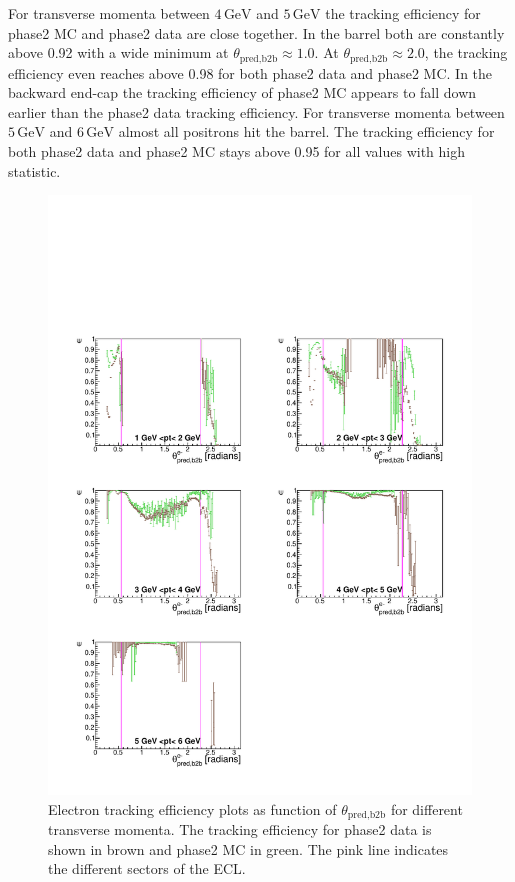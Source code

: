 \documentclass[a4paper,11pt,twosided,final,german,openbib,pdftex,listof=totoc,bibliography=totoc]{scrbook}
\begin{document}
For transverse momenta between $4\,\textrm{GeV}$  and $5\,\textrm{GeV}$ the tracking efficiency for phase2 MC and phase2 data are close together. In the barrel both are constantly above 0.92 with a wide minimum at $\theta_{\textrm{pred,b2b}} \approx 1.0$. At $\theta_{\textrm{pred,b2b}} \approx 2.0$, the tracking efficiency even reaches above 0.98 for both phase2 data and phase2 MC. In the backward end-cap the tracking efficiency of phase2 MC appears to fall down earlier than the phase2 data tracking efficiency.
For transverse momenta between $5\,\textrm{GeV}$ and $6\,\textrm{GeV}$ almost all positrons hit the barrel. The tracking efficiency for both phase2 data and phase2 MC stays above 0.95 for all values with high statistic.

\begin{figure}[!htbp]
	\centering
	\includegraphics[width=\textwidth]{Plots/master/xPtMThetaem}
	\caption[Transverse Momentum $\theta_{\textrm{pred,b2b}}$ Electron Efficiency Phase2]{Electron tracking efficiency plots as function of $\theta_{\textrm{pred,b2b}}$ for different transverse momenta. The tracking efficiency for phase2 data is shown in brown and phase2 MC in green. The pink line indicates the different sectors of the ECL.}
	\label{plt:xPtMThetaem}
\end{figure}
\end{document}
